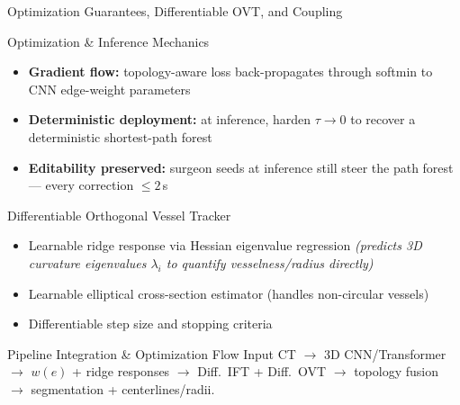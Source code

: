\documentclass[aspectratio=169,11pt,xcolor=table]{beamer}
\begin{document}
\begin{frame}{Optimization Guarantees, Differentiable OVT, and Coupling}
\scriptsize
\begin{block}{Optimization \& Inference Mechanics}
\begin{itemize}
\setlength\itemsep{1pt}
\item \textbf{Gradient flow:} topology-aware loss back-propagates through softmin to CNN edge-weight parameters
\item \textbf{Deterministic deployment:} at inference, harden $\tau\to 0$ to recover a deterministic shortest-path forest
\item \textbf{Editability preserved:} surgeon seeds at inference still steer the path forest --- every correction $\le 2$\,s
\end{itemize}
\end{block}
\vspace{0.05cm}
\begin{block}{Differentiable Orthogonal Vessel Tracker}
\begin{itemize}
\setlength\itemsep{1pt}
\item Learnable ridge response via Hessian eigenvalue regression \textit{(predicts 3D curvature eigenvalues $\lambda_i$ to quantify vesselness/radius directly)}
\item Learnable elliptical cross-section estimator (handles non-circular vessels)
\item Differentiable step size and stopping criteria
\end{itemize}
\end{block}
\vspace{0.05cm}
\begin{alertblock}{Pipeline Integration \& Optimization Flow}
Input CT $\to$ 3D CNN/Transformer $\to$ $w(e)$ + ridge responses $\to$ Diff.\ IFT + Diff.\ OVT $\to$ topology fusion $\to$ segmentation + centerlines/radii.
\end{alertblock}
\end{frame}
\end{document}
